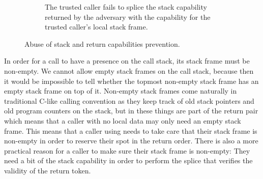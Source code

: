 \documentclass[acmsmall,review,showframe]{acmart}\settopmatter{printfolios=true,printccs=false,printacmref=false}
\begin{document}
\begin{figure}
\begin{subfigure}{0.4\linewidth}
    \caption{The trusted caller fails to splice the stack capability returned by
    the adversary with the capability for the trusted caller's local stack frame.}
    \label{fig:ret-ptr-abuse-prev}
  \end{subfigure}
  \caption{Abuse of stack and return capabilities prevention.}
\end{figure}

In order for a call to have a presence on the call stack, its stack frame must be non-empty.
We cannot allow empty stack frames on the call stack, because then it would be impossible to tell whether the topmost non-empty stack frame has an empty stack frame on top of it.
Non-empty stack frames come naturally in traditional C-like calling convention as they keep track of old stack pointers and old program counters on the stack, but in \stktokens{} these things are part of the return pair which means that a caller with no local data may only need an empty stack frame.
This means that a caller using \stktokens{} needs to take care that their stack frame is non-empty in order to reserve their spot in the return order.
There is also a more practical reason for a \stktokens{} caller to make sure their stack frame is non-empty: They need a bit of the stack capability in order to perform the splice that verifies the validity of the return token.
\end{document}
